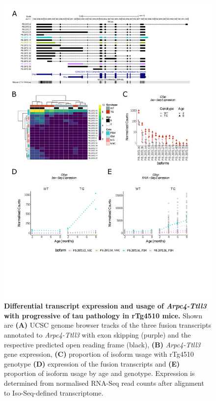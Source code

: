 \begin{figure}[!htp]
	\centering
	\includegraphics[page=7,trim={1.5cm 1.5cm 2cm 1cm}, scale = 0.80]{Figures/Ch5_DiffPlots.pdf}
	\captionsetup{width=0.95\textwidth}
	\caption[Differential \textit{Arpc4-Ttll3} transcript expression and usage]%
	{\textbf{Differential transcript expression and usage of \textit{Arpc4-Ttll3} with progressive of tau pathology in rTg4510 mice.} Shown are \textbf{(A)} UCSC genome browser tracks of the three fusion transcripts annotated to \textit{Arpc4-Ttll3} with exon skipping (purple) and the respective predicted open reading frame (black), \textbf{(B)} \textit{Arpc4-Ttll3} gene expression, \textbf{(C)} proportion of isoform usage with rTg4510 genotype \textbf{(D)} expression of the fusion transcripts and \textbf{(E)} proportion of isoform usage by age and genotype. Expression is determined from normalised RNA-Seq read counts after alignment to Iso-Seq-defined transcriptome.} 
	\label{fig:DIU_Arpc4}
\end{figure}

